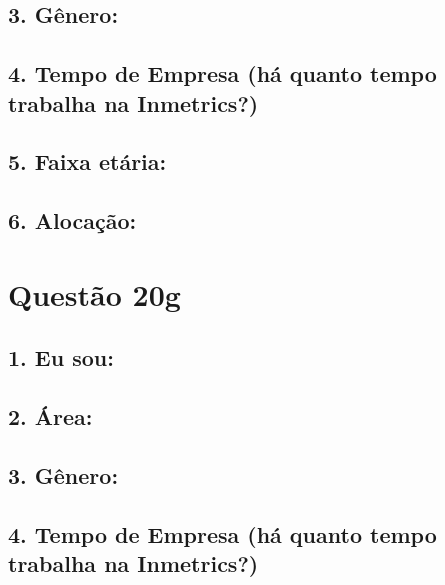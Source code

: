 \documentclass[]{book}
\begin{document}
\hypertarget{genero-58}{%
\subsection{3. Gênero:}\label{genero-58}}

\hypertarget{tempo-de-empresa-ha-quanto-tempo-trabalha-na-inmetrics-58}{%
\subsection{4. Tempo de Empresa (há quanto tempo trabalha na Inmetrics?)}\label{tempo-de-empresa-ha-quanto-tempo-trabalha-na-inmetrics-58}}

\hypertarget{faixa-etaria-58}{%
\subsection{5. Faixa etária:}\label{faixa-etaria-58}}

\hypertarget{alocacao-58}{%
\subsection{6. Alocação:}\label{alocacao-58}}

\hypertarget{questao-20g}{%
\section{Questão 20g}\label{questao-20g}}

\hypertarget{eu-sou-59}{%
\subsection{1. Eu sou:}\label{eu-sou-59}}

\hypertarget{area-59}{%
\subsection{2. Área:}\label{area-59}}

\hypertarget{genero-59}{%
\subsection{3. Gênero:}\label{genero-59}}

\hypertarget{tempo-de-empresa-ha-quanto-tempo-trabalha-na-inmetrics-59}{%
\subsection{4. Tempo de Empresa (há quanto tempo trabalha na Inmetrics?)}\label{tempo-de-empresa-ha-quanto-tempo-trabalha-na-inmetrics-59}}
\end{document}
